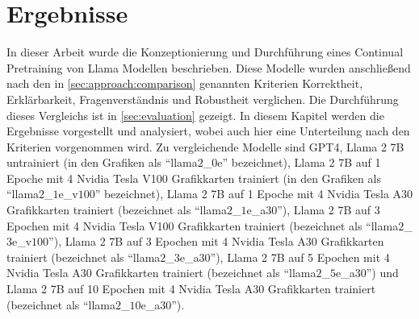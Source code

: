 \chapter{Ergebnisse}\label{ch:results}
In dieser Arbeit wurde die Konzeptionierung und Durchführung eines Continual Pretraining von Llama Modellen beschrieben.
Diese Modelle wurden anschließend nach den in \cref{sec:approach:comparison} genannten Kriterien Korrektheit, Erklärbarkeit, Fragenverständnis und Robustheit verglichen.
Die Durchführung dieses Vergleichs ist in \cref{sec:evaluation} gezeigt.
In diesem Kapitel werden die Ergebnisse vorgestellt und analysiert, wobei auch hier eine Unterteilung nach den Kriterien vorgenommen wird.
Zu vergleichende Modelle sind GPT4,
Llama 2 7B untrainiert (in den Grafiken als \enquote{llama$2$\_$0$e} bezeichnet),
Llama 2 7B auf 1 Epoche mit 4 Nvidia Tesla V100 Grafikkarten trainiert (in den Grafiken als \enquote{llama$2$\_$1$e\_v$100$} bezeichnet),
Llama 2 7B auf 1 Epoche mit 4 Nvidia Tesla A30 Grafikkarten trainiert (bezeichnet als \enquote{llama$2$\_$1$e\_a$30$}),
Llama 2 7B auf 3 Epochen mit 4 Nvidia Tesla V100 Grafikkarten trainiert (bezeichnet als \enquote{llama$2$\_$3$e\_v$100$}),
Llama 2 7B auf 3 Epochen mit 4 Nvidia Tesla A30 Grafikkarten trainiert (bezeichnet als \enquote{llama$2$\_$3$e\_a$30$}),
Llama 2 7B auf 5 Epochen mit 4 Nvidia Tesla A30 Grafikkarten trainiert (bezeichnet als \enquote{llama$2$\_$5$e\_a$30$}) und
Llama 2 7B auf 10 Epochen mit 4 Nvidia Tesla A30 Grafikkarten trainiert (bezeichnet als \enquote{llama$2$\_$10$e\_a$30$}).

